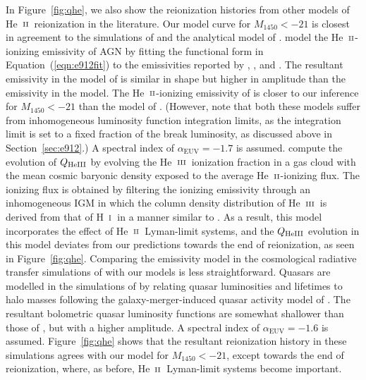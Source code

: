 \documentclass[fleqn,usenatbib]{mnras}
\def\HI{\hbox{H~$\scriptstyle\rm I$}}
\def\nHeIII{{\rm HeIII}}
\def\HeII{\hbox{He~$\scriptstyle\rm II$}}
\def\HeIII{\hbox{He~$\scriptstyle\rm III$}}
\def\HeIII{\hbox{He~$\scriptstyle\rm III$}}
\begin{document}
In Figure~\ref{fig:qhe}, we also show the reionization histories from
other models of \HeII\ reionization in the literature.  Our model
curve for $M_\mathrm{1450}<-21$ is closest in agreement to the
simulations of \citet{2009ApJ...694..842M} and the analytical model of
\citet{2018arXiv180104931P}.  \citet{2018arXiv180104931P} model the
\HeII-ionizing emissivity of AGN by fitting the functional form in
Equation~(\ref{eqn:e912fit}) to the emissivities reported by
\citet{2009A&A...507..781S}, \citet{2007A&A...472..443B}, and
\citet{2012ApJ...755..169M}.  The resultant emissivity in the model of
\citet{2018arXiv180104931P} is similar in shape but higher in
amplitude than the emissivity in the \citet{2012ApJ...746..125H}
model.  The \HeII-ionizing emissivity of \citet{2018arXiv180104931P}
is closer to our inference for $M_\mathrm{1450}<-21$ than the model of
\citet{2012ApJ...746..125H}.  (However, note that both these models
suffer from inhomogeneous luminosity function integration limits, as
the integration limit is set to a fixed fraction of the break
luminosity, as discussed above in Section~\ref{sec:e912}.)  A spectral
index of $\alpha_\mathrm{EUV}=-1.7$ is assumed.
\citet{2018arXiv180104931P} compute the evolution of $Q_\nHeIII$ by
evolving the \HeIII\ ionization fraction in a gas cloud with the mean
cosmic baryonic density exposed to the average \HeII-ionizing flux.
The ionizing flux is obtained by filtering the ionizing emissivity
through an inhomogeneous IGM in which the column density distribution
of \HeIII\ is derived from that of \HI\ in a manner similar to
\citet{2012ApJ...746..125H}.  As a result, this model incorporates the
effect of \HeII\ Lyman-limit systems, and the $Q_\nHeIII$ evolution in
this model deviates from our predictions towards the end of
reionization, as seen in Figure~\ref{fig:qhe}.  Comparing the
emissivity model in the cosmological radiative transfer simulations of
\citet{2009ApJ...694..842M} with our models is less straightforward.
Quasars are modelled in the simulations of \citet{2009ApJ...694..842M}
by relating quasar luminosities and lifetimes to halo masses following
the galaxy-merger-induced quasar activity model of
\citet{2005ApJ...630..705H}.  The resultant bolometric quasar
luminosity functions are somewhat shallower than those of
\citet{2007ApJ...654..731H}, but with a higher amplitude.  A spectral
index of $\alpha_\mathrm{EUV}=-1.6$ is assumed.  Figure~\ref{fig:qhe}
shows that the resultant reionization history in these simulations
agrees with our model for $M_\mathrm{1450}<-21$, except towards the
end of reionization, where, as before, \HeII\ Lyman-limit systems
become important.
\end{document}
